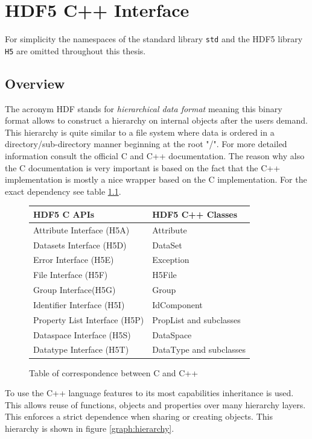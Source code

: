 \chapter{HDF5 C++ Interface}
For simplicity the namespaces of the standard library \texttt{std} and the HDF5 library \texttt{H5} are omitted throughout this thesis.
\section{Overview}
The acronym HDF stands for \emph{hierarchical data format} meaning this binary format allows to construct a hierarchy on internal objects after the users demand. This hierarchy is quite similar to a file system where data is ordered in a directory/sub-directory manner beginning at the root "/". For more detailed information consult the official C \cite{hdf5cdoc} and C++ \cite{hdf5cppdoc} documentation. The reason why also the C documentation is very important is based on the fact that the C++ implementation is mostly a nice wrapper based on the C implementation. For the exact dependency see table \ref{table:corrs}. \\ %
\begin{figure}[ht!]
\centering
\begin{tabular}{|l|l|}
\hline
HDF5 C APIs&HDF5 C++ Classes\\
\hline
Attribute Interface (H5A)&Attribute\\
Datasets Interface (H5D)&DataSet\\
Error Interface (H5E)&Exception\\
File Interface (H5F)&H5File\\
Group Interface(H5G)&Group\\
Identifier Interface (H5I)&IdComponent\\
Property List Interface (H5P)&PropList and subclasses\\
Dataspace Interface (H5S)&DataSpace\\
Datatype Interface (H5T)&DataType and subclasses\\
\hline
\end{tabular}
\caption{Table of correspondence between C and C++}
\label{table:corrs}
\end{figure}
To use the C++ language features to its most capabilities inheritance is used. This allows reuse of functions, objects and properties over many hierarchy layers. This enforces a strict dependence when sharing or creating objects. This hierarchy is shown in figure \ref{graph:hierarchy}.

